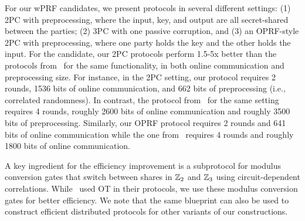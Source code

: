 For our wPRF candidates, we present protocols in several different settings: (1) 2PC with preprocessing, where the input, key, and output are all secret-shared between the parties; (2) 3PC with one passive corruption, and (3) an OPRF-style 2PC with preprocessing, where one party holds the key and the other holds the input. For the \ttwPRF candidate, our 2PC protocols perform 1.5-5x better than the protocols from~\cite{boneh2018-darkmatter} for the same functionality, in both online communication and preprocessing size. For instance, in the 2PC setting, our protocol requires 2 rounds, 1536 bits of online communication, and 662 bits of preprocessing (i.e., correlated randomness). In contrast, the protocol from~\cite{boneh2018-darkmatter} for the same setting requires 4 rounds, roughly 2600 bits of online communication and roughly 3500 bits of preprocessing. Similarly, our OPRF protocol requires 2 rounds and 641 bits of online communication while the one from~\cite{boneh2018-darkmatter} requires 4 rounds and roughly 1800 bits of online communication.

A key ingredient for the efficiency improvement is a subprotocol for modulus conversion gates that switch between shares in $\mathbb{Z}_2$ and $\mathbb{Z}_3$ using circuit-dependent correlations. While~\cite{boneh2018-darkmatter} used OT in their protocols, we use these modulus conversion gates for better efficiency. We note that the same blueprint can also be used to construct efficient distributed protocols for other variants of our constructions.

